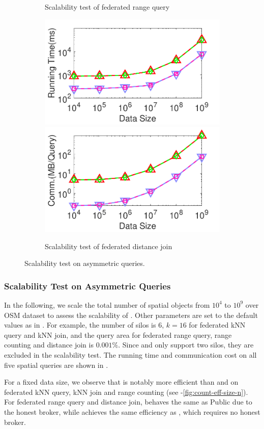 \begin{figure}[t]
\begin{subfigure}{0.48\textwidth}
        \caption{Scalability test of federated range query}
        \label{fig:range-eff-size-n}
    \end{subfigure}
	\begin{subfigure}{0.48\textwidth}
        \centering
        \includegraphics[width=0.48\linewidth]{dj_datasize_time.pdf}
        \includegraphics[width=0.48\linewidth]{dj_datasize_cost.pdf}
        \caption{Scalability test of federated distance join}
        \label{fig:distjoin-eff-size-n}
    \end{subfigure}
    \caption{Scalability test on asymmetric queries.}
    \label{fig:exp-scala}
\end{figure}

\subsubsection{Scalability Test on Asymmetric Queries}
\label{subsec:exp-asymm-scalability}

In the following, we scale the total number of spatial objects from $10^4$ to $10^9$ over OSM dataset to assess the scalability of \sysname.
Other parameters are set to the default values as in .
For example, the number of silos is $6$, $k=16$ for federated kNN query and kNN join, and the query area for federated range query, range counting and distance join is $0.001\%$.
Since \smcql and \smcqlext only support two silos, they are excluded in the scalability test.
The running time and communication cost on all five spatial queries are shown in .

For a fixed data size, we observe that \sysname is notably more efficient than \conclave and \conclaveext on federated kNN query, kNN join and range counting (see -\ref{fig:count-eff-size-n}).
For federated range query and distance join, \conclave behaves the same as Public due to the honest broker, while \sysname achieves the same efficiency as \conclaveext, which requires no honest broker.

